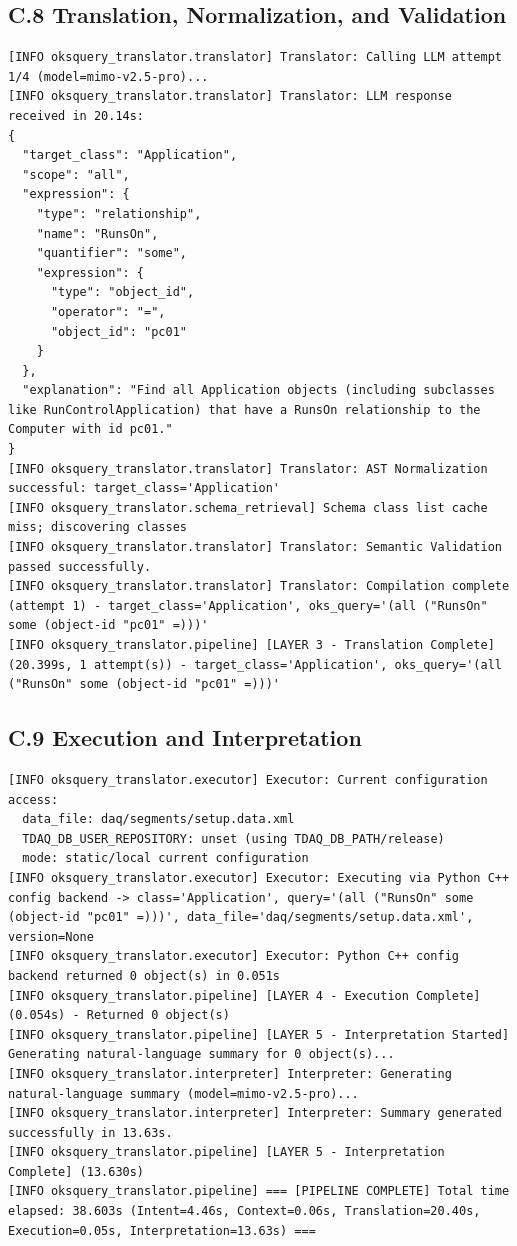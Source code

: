 \documentclass[12pt, a4paper]{report}
\begin{document}
\clearpage
\subsection*{C.8 Translation, Normalization, and Validation}
\begin{lstlisting}
[INFO oksquery_translator.translator] Translator: Calling LLM attempt 1/4 (model=mimo-v2.5-pro)...
[INFO oksquery_translator.translator] Translator: LLM response received in 20.14s:
{
  "target_class": "Application",
  "scope": "all",
  "expression": {
    "type": "relationship",
    "name": "RunsOn",
    "quantifier": "some",
    "expression": {
      "type": "object_id",
      "operator": "=",
      "object_id": "pc01"
    }
  },
  "explanation": "Find all Application objects (including subclasses like RunControlApplication) that have a RunsOn relationship to the Computer with id pc01."
}
[INFO oksquery_translator.translator] Translator: AST Normalization successful: target_class='Application'
[INFO oksquery_translator.schema_retrieval] Schema class list cache miss; discovering classes
[INFO oksquery_translator.translator] Translator: Semantic Validation passed successfully.
[INFO oksquery_translator.translator] Translator: Compilation complete (attempt 1) - target_class='Application', oks_query='(all ("RunsOn" some (object-id "pc01" =)))'
[INFO oksquery_translator.pipeline] [LAYER 3 - Translation Complete] (20.399s, 1 attempt(s)) - target_class='Application', oks_query='(all ("RunsOn" some (object-id "pc01" =)))'
\end{lstlisting}

\subsection*{C.9 Execution and Interpretation}
\begin{lstlisting}
[INFO oksquery_translator.executor] Executor: Current configuration access:
  data_file: daq/segments/setup.data.xml
  TDAQ_DB_USER_REPOSITORY: unset (using TDAQ_DB_PATH/release)
  mode: static/local current configuration
[INFO oksquery_translator.executor] Executor: Executing via Python C++ config backend -> class='Application', query='(all ("RunsOn" some (object-id "pc01" =)))', data_file='daq/segments/setup.data.xml', version=None
[INFO oksquery_translator.executor] Executor: Python C++ config backend returned 0 object(s) in 0.051s
[INFO oksquery_translator.pipeline] [LAYER 4 - Execution Complete] (0.054s) - Returned 0 object(s)
[INFO oksquery_translator.pipeline] [LAYER 5 - Interpretation Started] Generating natural-language summary for 0 object(s)...
[INFO oksquery_translator.interpreter] Interpreter: Generating natural-language summary (model=mimo-v2.5-pro)...
[INFO oksquery_translator.interpreter] Interpreter: Summary generated successfully in 13.63s.
[INFO oksquery_translator.pipeline] [LAYER 5 - Interpretation Complete] (13.630s)
[INFO oksquery_translator.pipeline] === [PIPELINE COMPLETE] Total time elapsed: 38.603s (Intent=4.46s, Context=0.06s, Translation=20.40s, Execution=0.05s, Interpretation=13.63s) ===
\end{lstlisting}
\end{document}

